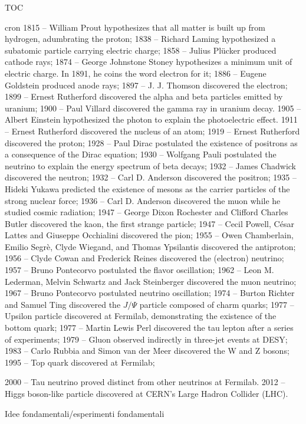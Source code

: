 \begin{frame}[label={intro}]{TOC}

\tableofcontents[onlyparts]

\end{frame}

\begin{frame}[allowframebreaks]{cron}
        1815 – William Prout hypothesizes that all matter is built up from hydrogen, adumbrating the proton;
    1838 – Richard Laming hypothesized a subatomic particle carrying electric charge;
    1858 – Julius Plücker produced cathode rays;
    1874 – George Johnstone Stoney hypothesizes a minimum unit of electric charge. In 1891, he coins the word electron for it;
    1886 – Eugene Goldstein produced anode rays;
    1897 – J. J. Thomson discovered the electron;
    1899 – Ernest Rutherford discovered the alpha and beta particles emitted by uranium;
    1900 – Paul Villard discovered the gamma ray in uranium decay.
    1905 – Albert Einstein hypothesized the photon to explain the photoelectric effect.
    1911 – Ernest Rutherford discovered the nucleus of an atom;
    1919 – Ernest Rutherford discovered the proton;
    1928 – Paul Dirac postulated the existence of positrons as a consequence of the Dirac equation;
    1930 – Wolfgang Pauli postulated the neutrino to explain the energy spectrum of beta decays;
    1932 – James Chadwick discovered the neutron;
    1932 – Carl D. Anderson discovered the positron;
    1935 – Hideki Yukawa predicted the existence of mesons as the carrier particles of the strong nuclear force;
    1936 – Carl D. Anderson discovered the muon while he studied cosmic radiation;
    1947 – George Dixon Rochester and Clifford Charles Butler discovered the kaon, the first strange particle;
    1947 – Cecil Powell, César Lattes and Giuseppe Occhialini discovered the pion;
    1955 – Owen Chamberlain, Emilio Segrè, Clyde Wiegand, and Thomas Ypsilantis discovered the antiproton;
    1956 – Clyde Cowan and Frederick Reines discovered the (electron) neutrino;
    1957 – Bruno Pontecorvo postulated the flavor oscillation;
    1962 – Leon M. Lederman, Melvin Schwartz and Jack Steinberger discovered the muon neutrino;
    1967 – Bruno Pontecorvo postulated neutrino oscillation;
    1974 – Burton Richter and Samuel Ting discovered the $J/\Psi$ particle composed of charm quarks;
    1977 – Upsilon particle discovered at Fermilab, demonstrating the existence of the bottom quark;
    1977 – Martin Lewis Perl discovered the tau lepton after a series of experiments;
    1979 – Gluon observed indirectly in three-jet events at DESY;
    1983 – Carlo Rubbia and Simon van der Meer discovered the W and Z bosons;
    1995 – Top quark discovered at Fermilab;


    2000 – Tau neutrino proved distinct from other neutrinos at Fermilab.
    2012 – Higgs boson-like particle discovered at CERN's Large Hadron Collider (LHC).
\end{frame}

\begin{wordonframe}{Idee fondamentali/esperimenti fondamentali}

\end{wordonframe}

